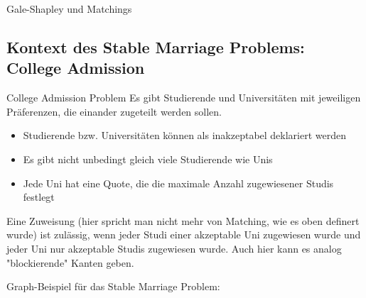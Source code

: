 \documentclass{panikzettel}
\begin{document}
{\begin{theo}{Gale-Shapley und Matchings}
\end{theo}

\subsection{Kontext des Stable Marriage Problems: College Admission}

\begin{halfboxl}
	\vspace{-\baselineskip}
	\begin{defi}{College Admission Problem}
		Es gibt Studierende und Universitäten mit jeweiligen Präferenzen, die einander zugeteilt werden sollen.\\
		
		\begin{itemize}
			\item Studierende bzw. Universitäten können als inakzeptabel deklariert werden
			\item Es gibt nicht unbedingt gleich viele Studierende wie Unis
			\item Jede Uni hat eine Quote, die die maximale Anzahl zugewiesener Studis festlegt
		\end{itemize}
	
	Eine Zuweisung (hier spricht man nicht mehr von Matching, wie es oben definert wurde) ist zulässig, wenn jeder Studi einer akzeptable Uni zugewiesen wurde und jeder Uni nur akzeptable Studis zugewiesen wurde. Auch hier kann es analog "blockierende" Kanten geben.
	\end{defi}
\end{halfboxl}%
\begin{halfboxr}
	\vspace{-\baselineskip}
	Graph-Beispiel für das Stable Marriage Problem:\\
	
	\begin{center}
\end{center}
\end{halfboxr}}
\end{document}
